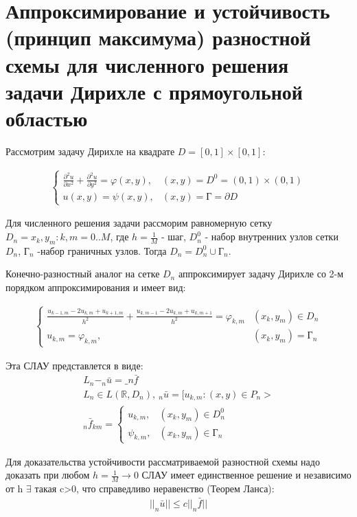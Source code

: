 \documentclass[__main__.tex]{subfiles}
\begin{document}
\section{Аппроксимирование и устойчивость (принцип максимума) разностной схемы для численного решения задачи Дирихле с прямоугольной областью}


Рассмотрим задачу Дирихле на квадрате $D=[0,1] \times[0,1]$:

\begin{gather}
	\begin{cases}
		\frac{\partial^2 u}{\partial x^2}+\frac{\partial^2 u}{\partial y^2}=\varphi(x,y),  & (x,y)=D^0=(0,1)\times(0,1)\\
		u(x,y)=\psi (x,y), & (x,y)=\text{Г}=\partial D
	\end{cases}
\end{gather}


Для численного решения задачи рассморим равномерную сетку $D_n ={x_k,y_m}:k,m=0..M$, где $h=\frac{1}{M} $ - шаг, $D_n ^0$ - набор внутренних узлов сетки $D_n$, $\text{Г}_n$ -набор граничных узлов. Тогда $D_{n} = D_n^0 \cup \text{Г}_n$.

Конечно-разностный аналог на сетке $D_n$ аппроксимирует задачу Дирихле со 2-м порядком аппроксимирования и имеет вид:

\begin{gather}
	\begin{cases}
	\frac{u_{k-1,m}-2u_{k,m}+u_{k+1,m}}{h^2}+\frac{u_{k,m-1}-2u_{k,m}+u_{k,m+1}}{h^2}=\varphi _{k,m} & (x_k,y_m)\in D_n \\
		u_{k,m}=\varphi _{k,m}, & (x_k,y_m)=\text{Г}_n
	\end{cases}
	\end{gather}


Эта СЛАУ представлется в виде:
\begin{gather}
	L_n- _n\bar{u}= \_n\bar{f}\\
	L_{n}\in L(\mathbb{R},D_n),\ _n\bar{u}=[u_{k,m}:(x,y)\in P_n>\\
	_n\bar{f}_{km}=\begin{cases}
		u_{k,m}, & (x_k,y_m)\in D_n^0\\
		\psi_{k,m}, & (x_k,y_m)\in \text{Г}_n
		\end{cases}
\end{gather}

Для доказательства устойчивости рассматриваемой разностной схемы  надо доказать  при любом $h=\frac{1}{M}\to 0$ СЛАУ имеет единственное решение и независимо от h $\exists$ такая c>0, что справедливо неравенство (Теорем Ланса):
\begin{gather}
	||_n\bar{u}|| \leq c||_n\bar{f}||
\end{gather}
\end{document}
